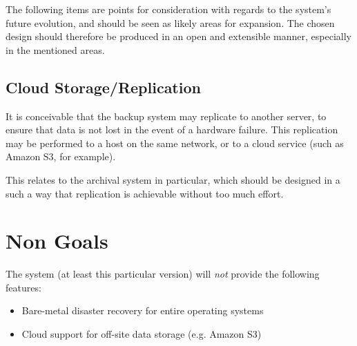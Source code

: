 The following items are points for consideration with regards to the system's
future evolution, and should be seen as likely areas for expansion. The chosen
design should therefore be produced in an open and extensible manner,
especially in the mentioned areas.

\subsection{Cloud Storage/Replication}

It is conceivable that the backup system may replicate to another server, to
ensure that data is not lost in the event of a hardware failure. This
replication may be performed to a host on the same network, or to a cloud
service (such as Amazon S3, for example).

This relates to the archival system in particular, which should be designed in
a such a way that replication is achievable without too much effort.

\section{Non Goals}

The system (at least this particular version) will \emph{not} provide the
following features:

\begin{itemize}
    \item Bare-metal disaster recovery for entire operating systems
    \item Cloud support for off-site data storage (e.g. Amazon S3)
\end{itemize}
